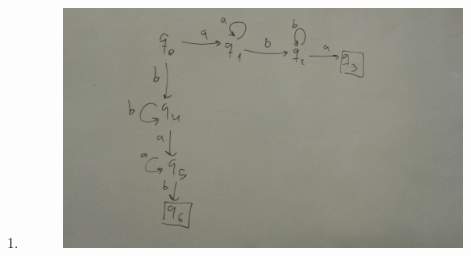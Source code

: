 \documentclass[twoside]{article}
\begin{document}
\begin{solucion}
\begin{enumerate}
\item 

\begin{figure}[h!]
\includegraphics[scale=0.1]{Automatas/1-4}
\end{figure}\
\end{enumerate}
\end{solucion}

\newpage
\end{document}
